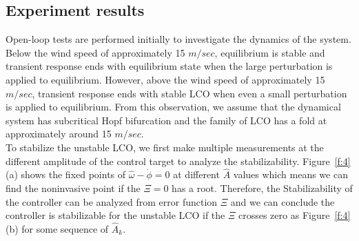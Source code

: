 \documentclass[openacc]{rsproca_new}%
\theoremstyle{own}
\newcommand{\Fref}[1]{Figure~\ref{#1}}
\begin{document}
\subsection{Experiment results}
Open-loop tests are performed initially to investigate the dynamics of the system. Below the wind speed of approximately 15 $m/sec$, equilibrium is stable and transient response ends with equilibrium state when the large perturbation is applied to equilibrium. However, above the wind speed of approximately 15 $m/sec$, transient response ends with stable LCO when even a small perturbation is applied to equilibrium. From this observation, we assume that the dynamical system has subcritical Hopf bifurcation and the family of LCO has a fold at approximately around 15 $m/sec$.\\
To stabilize the unstable LCO, we first make multiple measurements at the different amplitude of the control target to analyze the stabilizability. \Fref{f:4} (a) shows the fixed points of $\hat \omega-\dot \phi=0$ at different $\hat A$ values which means we can find the noninvasive point if the $\Xi=0$ has a root. Therefore, the Stabilizability of the controller can be analyzed from error function $\Xi$ and we can conclude the controller is stabilizable for the unstable LCO if the $\Xi$ crosses zero as \Fref{f:4} (b) for some sequence of $\hat A_k$.
\end{document}
